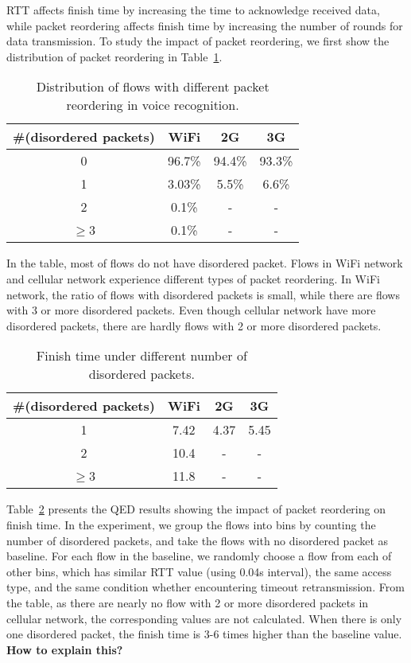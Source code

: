 RTT affects finish time by increasing the time to acknowledge received data, while packet reordering affects finish time by increasing the number of rounds for data transmission. To study the impact of packet reordering, we first show the distribution of packet reordering in Table~\ref{tab:voice_reorder}.

\begin{table}[th]
\caption{Distribution of flows with different packet reordering in voice recognition.}
\label{tab:voice_reorder}
\centering
\renewcommand{\arraystretch}{1.2}
\begin{tabular}{c|c|c|c}
\toprule
\#(disordered packets) & WiFi & 2G & 3G \\
\midrule
0 & 96.7\% & 94.4\% & 93.3\% \\
\hline
1 & 3.03\% & 5.5\% & 6.6\% \\
\hline
2 & 0.1\% & - & - \\
\hline
$\ge$3 & 0.1\% & - & - \\
\bottomrule
\end{tabular}
\end{table}

In the table, most of flows do not have disordered packet. Flows in WiFi network and cellular network experience different types of packet reordering. In WiFi network, the ratio of flows with disordered packets is small, while there are flows with 3 or more disordered packets. Even though cellular network have more disordered packets, there are hardly flows with 2 or more disordered packets.

\begin{table}[th]
\caption{Finish time under different number of disordered packets.}
\label{tab:voice_qed_reorder}
\centering
\renewcommand{\arraystretch}{1.2}
\begin{tabular}{c|c|c|c}
	\toprule
	\#(disordered packets) & WiFi & 2G & 3G \\
	\midrule
	1 & 7.42 & 4.37 & 5.45 \\
	\hline
	2 & 10.4 & - & - \\
	\hline
	$\ge$3 & 11.8 & - & - \\
	\bottomrule
\end{tabular}
\end{table}

Table~\ref{tab:voice_qed_reorder} presents the QED results showing the impact of packet reordering on finish time. In the experiment, we group the flows into bins by counting the number of disordered packets, and take the flows with no disordered packet as baseline. For each flow in the baseline, we randomly choose a flow from each of other bins, which has similar RTT value (using 0.04s interval), the same access type, and the same condition whether encountering timeout retransmission. From the table, as there are nearly no flow with 2 or more disordered packets in cellular network, the corresponding values are not calculated. When there is only one disordered packet, the finish time is 3-6 times higher than the baseline value. \textbf{How to explain this?}

